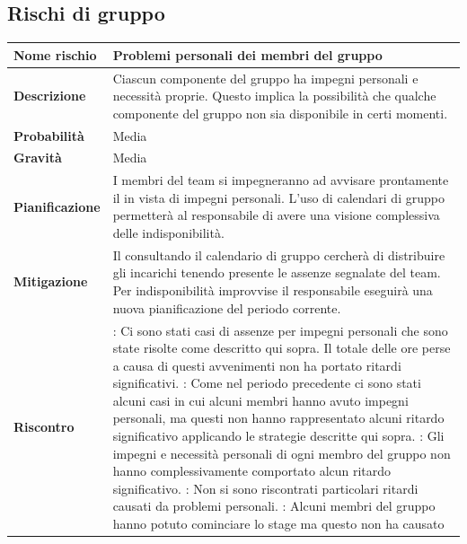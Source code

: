 \documentclass[12pt,a4paper]{article}
\begin{document}
\subsection{Rischi di gruppo}


\begin{center}
	\begin{longtable}[H]{p{} p{}}
		\toprule
		\textbf{Nome rischio} & \textbf{Problemi personali dei membri del gruppo} \\*
		\midrule
		\midrule
		\textbf{Descrizione} & Ciascun componente del gruppo ha impegni personali e necessità proprie. Questo implica la possibilità che qualche componente del gruppo non sia disponibile in certi momenti. \\*
		\midrule
		\textbf{Probabilità} & Media \\*
		\midrule
		\textbf{Gravità} & Media \\*
		\midrule
		\textbf{Pianificazione} & I membri del team si impegneranno ad avvisare prontamente il \PM{} in vista di impegni personali. L’uso di calendari di gruppo permetterà al responsabile di avere una visione complessiva delle indisponibilità.  \\*
		\midrule
		\textbf{Mitigazione} & Il \PM{} consultando il calendario di gruppo cercherà di distribuire gli incarichi tenendo presente le assenze segnalate del team. Per indisponibilità improvvise il responsabile eseguirà una nuova pianificazione del periodo corrente. \\*
		\midrule
		\textbf{Riscontro} & 
            \textbf{\FA{}}: Ci sono stati casi di assenze per impegni personali che sono state 
                risolte come descritto qui sopra. Il totale delle ore perse a causa di questi avvenimenti 
                non ha portato ritardi significativi. \newline
            \textbf{\FAD{}}: Come nel periodo precedente ci sono stati alcuni casi in cui alcuni membri
                hanno avuto impegni personali, ma questi non hanno rappresentato alcuni ritardo significativo
                applicando le strategie descritte qui sopra. \newline
            \textbf{\FPA{}}: Gli impegni e necessità personali di ogni membro del gruppo non hanno
                complessivamente comportato alcun ritardo significativo. \newline
            \textbf{\FPD{}}: Non si sono riscontrati particolari ritardi causati da problemi personali. \newline
          	\textbf{\FC{}}: Alcuni membri del gruppo hanno potuto cominciare lo stage ma questo non ha causato

\end{longtable}
\end{center}
\end{document}
